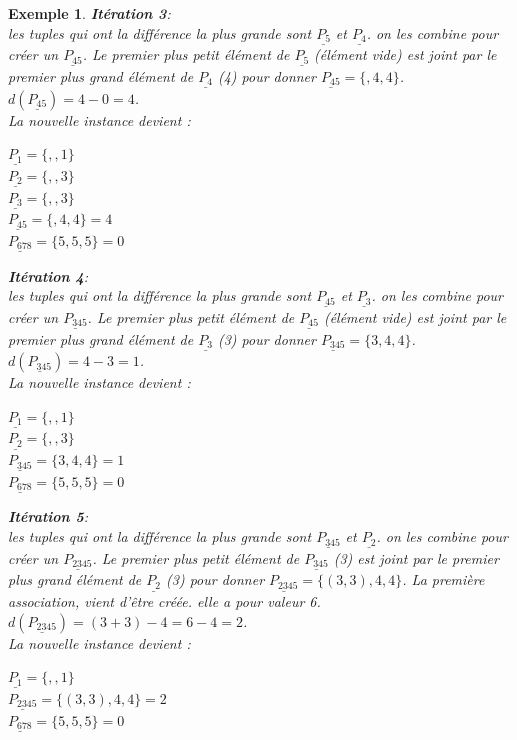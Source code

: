 \documentclass[a4paper,12pt]{report}
\theoremstyle{plain}				%
\newtheorem{example}{Exemple}
\theoremstyle{definition}				%
\begin{document}
\begin{itemize}
\begin{example}
\textbf{Itération 3}:\\
les tuples qui ont la différence la plus grande sont 
$\underline{P_{5}}$  et $\underline{P_{4}}$. 
on les combine pour créer un $\underline{P_{45}}$. Le premier plus petit élément de $\underline{P_{5}}$ (élément vide) est joint par le premier plus grand élément de $\underline{P_{4}}$ (4) pour donner  $\underline{P_{45}} = \{,4,4\}$. $d(\underline{P_{45}}) = 4-0 = 4$.\\
La nouvelle instance devient :\\
\begin{multicols}{3}
$\underline{P_{1}} = \{,,1\}$\\
$\underline{P_{2}} = \{,,3\}$\\
$\underline{P_{3}} = \{,,3\}$\\
$\underline{P_{45}} = \{,4,4\}=4$\\
$\underline{P_{678}} = \{5,5,5\}=0$\\
\end{multicols}

\textbf{Itération 4}:\\
les tuples qui ont la différence la plus grande sont 
$\underline{P_{45}}$  et $\underline{P_{3}}$. 
on les combine pour créer un $\underline{P_{345}}$. Le premier plus petit élément de $\underline{P_{45}}$ (élément vide) est joint par le premier plus grand élément de $\underline{P_{3}}$ (3) pour donner  $\underline{P_{345}} = \{3,4,4\}$. $d(\underline{P_{345}}) = 4-3 = 1$.\\
La nouvelle instance devient :\\
\begin{multicols}{3}
$\underline{P_{1}} = \{,,1\}$\\
$\underline{P_{2}} = \{,,3\}$\\
$\underline{P_{345}} = \{3,4,4\}=1$\\
$\underline{P_{678}} = \{5,5,5\}=0$\\
\end{multicols}

\textbf{Itération 5}:\\
les tuples qui ont la différence la plus grande sont 
$\underline{P_{345}}$  et $\underline{P_{2}}$. 
on les combine pour créer un $\underline{P_{2345}}$. Le premier plus petit élément de $\underline{P_{345}}$ (3) est joint par le premier plus grand élément de $\underline{P_{2}}$ (3) pour donner  $\underline{P_{2345}} = \{(3,3),4,4\}$. La première association, vient d'être créée. elle a pour valeur 6. 
$d(\underline{P_{2345}}) = (3+3)-4 = 6-4=2$.\\
La nouvelle instance devient :\\
\begin{multicols}{2}
$\underline{P_{1}} = \{,,1\}$\\
$\underline{P_{2345}} = \{(3,3),4,4\}=2$\\
$\underline{P_{678}} = \{5,5,5\}=0$\\
\end{multicols}


\end{example}
\end{itemize}
\end{document}
